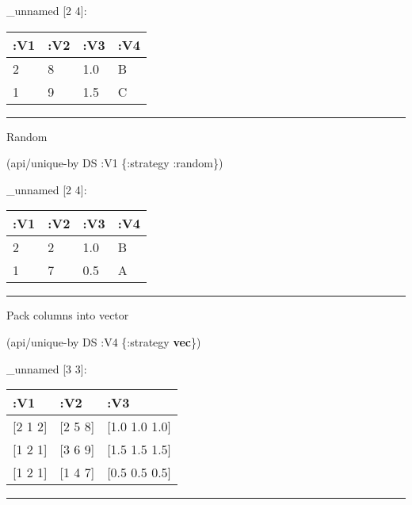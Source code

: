 \documentclass[]{article}
\newenvironment{Shaded}{\begin{snugshade}}{\end{snugshade}}
\newcommand{\AttributeTok}[1]{\textcolor[rgb]{0.77,0.63,0.00}{#1}}
\newcommand{\KeywordTok}[1]{\textcolor[rgb]{0.13,0.29,0.53}{\textbf{#1}}}
\newcommand{\NormalTok}[1]{#1}
\begin{document}
\_unnamed {[}2 4{]}:

\begin{longtable}[]{@{}llll@{}}
\toprule
:V1 & :V2 & :V3 & :V4\tabularnewline
\midrule
\endhead
2 & 8 & 1.0 & B\tabularnewline
1 & 9 & 1.5 & C\tabularnewline
\bottomrule
\end{longtable}

\begin{center}\rule{0.5\linewidth}{0.5pt}\end{center}

Random

\begin{Shaded}
\begin{Highlighting}[]
\NormalTok{(api/unique-by DS }\AttributeTok{:V1}\NormalTok{ \{}\AttributeTok{:strategy} \AttributeTok{:random}\NormalTok{\})}
\end{Highlighting}
\end{Shaded}

\_unnamed {[}2 4{]}:

\begin{longtable}[]{@{}llll@{}}
\toprule
:V1 & :V2 & :V3 & :V4\tabularnewline
\midrule
\endhead
2 & 2 & 1.0 & B\tabularnewline
1 & 7 & 0.5 & A\tabularnewline
\bottomrule
\end{longtable}

\begin{center}\rule{0.5\linewidth}{0.5pt}\end{center}

Pack columns into vector

\begin{Shaded}
\begin{Highlighting}[]
\NormalTok{(api/unique-by DS }\AttributeTok{:V4}\NormalTok{ \{}\AttributeTok{:strategy} \KeywordTok{vec}\NormalTok{\})}
\end{Highlighting}
\end{Shaded}

\_unnamed {[}3 3{]}:

\begin{longtable}[]{@{}lll@{}}
\toprule
:V1 & :V2 & :V3\tabularnewline
\midrule
\endhead
{[}2 1 2{]} & {[}2 5 8{]} & {[}1.0 1.0 1.0{]}\tabularnewline
{[}1 2 1{]} & {[}3 6 9{]} & {[}1.5 1.5 1.5{]}\tabularnewline
{[}1 2 1{]} & {[}1 4 7{]} & {[}0.5 0.5 0.5{]}\tabularnewline
\bottomrule
\end{longtable}

\begin{center}\rule{0.5\linewidth}{0.5pt}\end{center}
\end{document}
